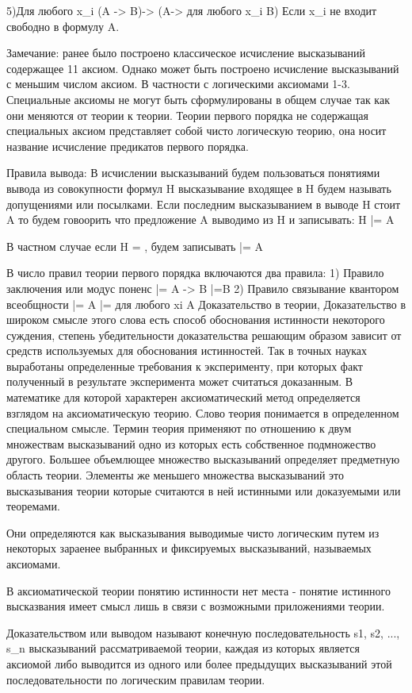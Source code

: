 5)Для любого x_i (A -> B)-> (A-> для любого x_i B)
Если x_i не входит свободно в формулу A.

Замечание: ранее было построено классическое исчисление высказываний содержащее 11 аксиом. Однако может быть построено исчисление высказываний с меньшим числом аксиом. В частности с логическими аксиомами 1-3. Специальные аксиомы не могут быть сформулированы в общем случае так как они меняются от теории к теории. Теории первого порядка не содержащая специальных аксиом представляет собой чисто логическую теорию, она носит название исчисление предикатов первого порядка.

Правила вывода:
В исчислении высказываний будем пользоваться понятиями вывода из совокупности формул H высказывание входящее в H будем называть допущениями или посылками. Если последним высказыванием в выводе H стоит A то будем говоорить что предложение A выводимо из H и записывать: H |= A

В частном случае если H = \empty, будем записывать |= A

В число правил теории первого порядка включаются два правила:
1) Правило заключения или модус поненс
|= A -> B |=B
2) Правило связывание квантором всеобщности |= A |= для любого xi A
Доказательство в теории,
Доказательство в широком смысле этого слова есть способ обоснования истинности некоторого суждения, степень убедительности доказательства решающим образом зависит от средств используемых для обоснования истинностей.
Так в точных науках выработаны определенные требования к эксперименту, при которых факт полученный в результате эксперимента может считаться доказанным. В математике для которой характерен аксиоматический метод определяется взглядом на аксиоматическую теорию. Слово теория понимается в определенном специальном смысле. Термин теория применяют по отношению к двум множествам высказываний одно из которых есть собственное подмножество другого. Большее объемлющее множество высказываний определяет предметную область теории. Элементы же меньшего множества высказываний это высказывания теории которые считаются в ней истинными или доказуемыми или теоремами.

Они определяются как высказывания выводимые чисто логическим путем из некоторых зараенее выбранных и фиксируемых высказываний, называемых аксиомами.

В аксиоматической теории понятию истинности нет места - понятие истинного высказвания имеет смысл лишь в связи с возможными приложениями теории.

Доказательством или выводом называют конечную последовательность s1, s2, ..., s_n высказываний рассматриваемой теории, каждая из которых является аксиомой либо выводится из одного или более предыдущих высказываний этой последовательности по логическим правилам теории.

